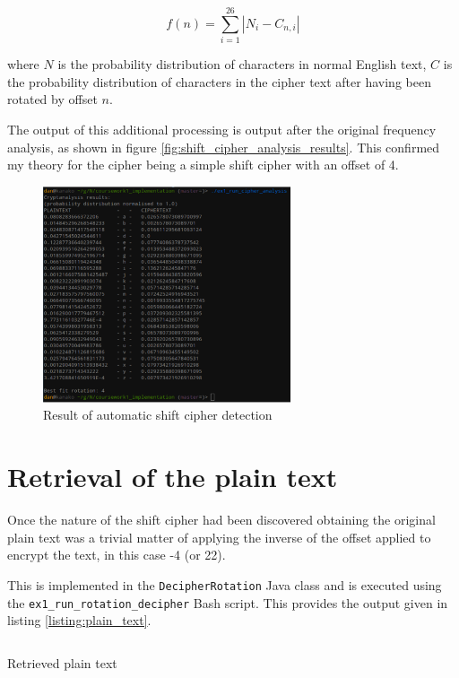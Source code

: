 \documentclass[a4paper]{article}
\begin{document}
\begin{equation}
  f(n) = \sum_{i = 1}^{26} |N_{i} - C_{n, i}|
  \label{eq:offset_goal_function}
\end{equation}

where $N$ is the probability distribution of characters in normal English text,
$C$ is the probability distribution of characters in the cipher text after
having been rotated by offset $n$.

The output of this additional processing is output after the original frequency
analysis, as shown in figure \ref{fig:shift_cipher_analysis_results}. This
confirmed my theory for the cipher being a simple shift cipher with an offset of
4.

\begin{figure}[h!]
  \centering
  \includegraphics[width=0.65\textwidth]{graphics/ex1_cipher_analysis.eps}
  \caption{Result of automatic shift cipher detection}
  \label{fig:plaintext_output}
  \label{listing:shift_cipher_analysis_results}
\end{figure}

\section{Retrieval of the plain text}

Once the nature of the shift cipher had been discovered obtaining the original
plain text was a trivial matter of applying the inverse of the offset applied to
encrypt the text, in this case -4 (or 22).

This is implemented in the \texttt{DecipherRotation} Java class and is executed
using the \texttt{ex1\_run\_rotation\_decipher} Bash script. This provides the
output given in listing \ref{listing:plain_text}.

\begin{listing}
  \inputminted[frame=lines,fontsize=\scriptsize]{text}{../coursework1_implementation/src/test/resources/Exercise1Plaintext.txt}
  \caption{Retrieved plain text}
  \label{listing:plain_text}
\end{listing}

\printbibliography
\end{document}
